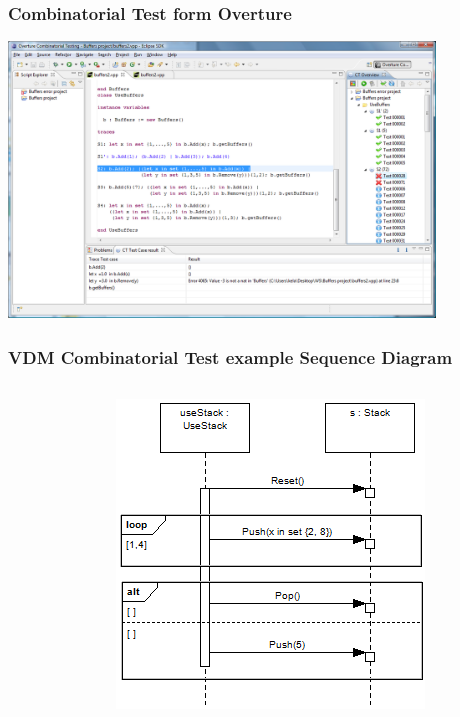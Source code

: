 \frame
{
  \frametitle{Combinatorial Test form Overture}
	\begin{center}
	\includegraphics[width=0.85\textwidth]{images/CTOverview.png}%
	\end{center}
}

%
%
\frame
{
  \frametitle{VDM Combinatorial Test example Sequence Diagram}
  
\begin{columns}
\begin{column}[l]{5cm}

	\begin{center}
	\end{center}

\end{column}
\begin{column}[r]{5cm}
	
	\begin{center}
	\includegraphics[width=\textwidth]{images/TracesSequenceDiagramEx2.png}%
	\end{center}

\end{column}
\end{columns}
  

}

